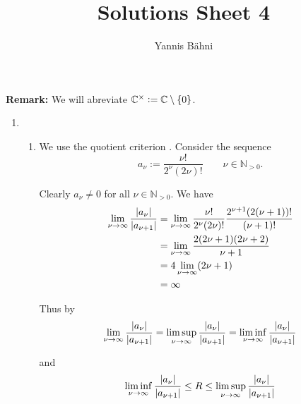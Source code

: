 

\title{Solutions Sheet 4}
\author{Yannis B\"{a}hni}
\address[Yannis B\"{a}hni]{University of Zurich, R\"{a}mistrasse 71, 8006 Zurich}


\maketitle
\thispagestyle{fancy}
\textbf{Remark:} We will abreviate $\mathbb{C}^\times := \mathbb{C} \setminus \cbr[0]{0}$.
\begin{enumerate}[label = \textbf{Exercise \arabic*.},wide = 0pt, itemsep=1.5ex]
	\item
		~
		\begin{enumerate}[label = (\alph*),wide = 0pt, itemsep=1.5ex]
			\item We use the quotient criterion \cite[100]{remmert2002funktionentheorie}. Consider the sequence
				\begin{equation}
					a_\nu := \frac{\nu!}{2^\nu (2\nu)!} \qquad \nu \in \mathbb{N}_{> 0}.
				\end{equation}

				Clearly $a_\nu \neq 0$ for all $\nu \in \mathbb{N}_{>0}$. We have 
				\begin{align*}
					\lim_{\nu \to \infty} \frac{\abs[0]{a_\nu}}{\abs[0]{a_{\nu + 1}}} &= \lim_{\nu \to \infty} \frac{\nu!}{2^\nu(2\nu)!}\frac{2^{\nu + 1}(2(\nu + 1))!}{(\nu + 1)!}\\
					&= \lim_{\nu \to \infty} \frac{2(2\nu + 1)(2\nu + 2)}{\nu + 1}\\
					&= 4\lim_{\nu \to \infty}(2\nu + 1)\\
					&= \infty
				\end{align*}

				Thus by
				\begin{equation}
					\lim_{\nu \to \infty} \frac{\abs[0]{a_\nu}}{\abs[0]{a_{\nu + 1}}} = \limsup_{\nu \to \infty} \frac{\abs[0]{a_\nu}}{\abs[0]{a_{\nu + 1}}} = \liminf_{\nu \to \infty} \frac{\abs[0]{a_\nu}}{\abs[0]{a_{\nu + 1}}}
				\end{equation}

				\noindent and 
				\begin{equation}
					 \liminf_{\nu \to \infty} \frac{\abs[0]{a_\nu}}{\abs[0]{a_{\nu + 1}}} \leq R \leq \limsup_{\nu \to \infty} \frac{\abs[0]{a_\nu}}{\abs[0]{a_{\nu + 1}}}
				\end{equation}


\end{enumerate}
\end{enumerate}
